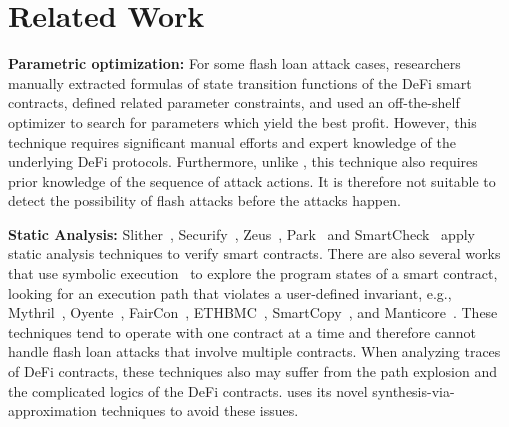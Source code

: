 \chapter{Related Work}
\label{sec:related}

\noindent \textbf{Parametric optimization:} For some flash loan attack cases,
researchers~\cite{cao2021flashot, qin2021attacking} manually extracted formulas
of state transition functions of the DeFi smart contracts, defined related
parameter constraints, and used an off-the-shelf optimizer to search for
parameters which yield the best profit. However, this technique requires
significant manual efforts and expert knowledge of the underlying DeFi
protocols. Furthermore, unlike {\name}, this technique also requires prior
knowledge of the sequence of attack actions. It is therefore not suitable
to detect the possibility of flash attacks before the attacks happen.

\noindent \textbf{Static Analysis:} 
Slither~\cite{feist2019slither}, Securify~\cite{tsankov2018securify},
Zeus~\cite{kalra2018zeus}, Park~\cite{zheng2022park} and
SmartCheck~\cite{tikhomirov2018smartcheck} apply static analysis techniques to
verify smart contracts. 
There are also several works that use
symbolic execution~\cite{king1976symbolic} to explore the program states of a
smart contract, looking for an execution path that violates a user-defined
invariant, e.g., Mythril~\cite{mythril}, Oyente~\cite{luu2016making},
FairCon~\cite{liu2020towards}, ETHBMC~\cite{frank2020ethbmc},
SmartCopy~\cite{feng2019precise}, and Manticore~\cite{mossberg2019manticore}.
These techniques tend to operate with one contract at a time and therefore cannot handle flash loan attacks that involve multiple contracts.
When analyzing traces of DeFi contracts, these techniques also may suffer from the
path explosion and the complicated logics of the DeFi contracts.
{\name} uses its novel synthesis-via-approximation techniques to avoid these issues.

%

